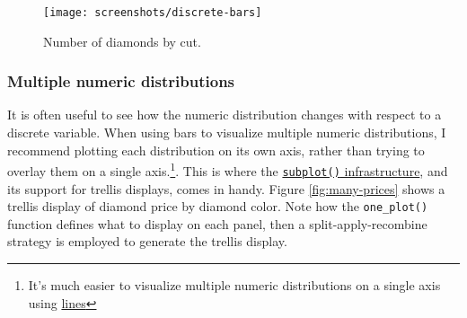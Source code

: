 \documentclass[12pt,]{isuthesis}
\newenvironment{Shaded}{\begin{snugshade}}{\end{snugshade}}
\newcommand{\KeywordTok}[1]{\textcolor[rgb]{0.13,0.29,0.53}{\textbf{{#1}}}}
\newcommand{\DataTypeTok}[1]{\textcolor[rgb]{0.13,0.29,0.53}{{#1}}}
\newcommand{\StringTok}[1]{\textcolor[rgb]{0.31,0.60,0.02}{{#1}}}
\newcommand{\NormalTok}[1]{{#1}}
\let\rmarkdownfootnote\footnote%
\def\footnote{\protect\rmarkdownfootnote}
\begin{document}
\begin{Shaded}
\end{Shaded}

\begin{figure}
\centering
\texttt{[image: screenshots/discrete-bars]}
\caption{\label{fig:discrete}Number of diamonds by cut.}
\end{figure}

\subsubsection{Multiple numeric
distributions}\label{multiple-numeric-distributions}

It is often useful to see how the numeric distribution changes with
respect to a discrete variable. When using bars to visualize multiple
numeric distributions, I recommend plotting each distribution on its own
axis, rather than trying to overlay them on a single axis.\footnote{It's
  much easier to visualize multiple numeric distributions on a single
  axis using \protect\hyperlink{lines}{lines}}. This is where the
\protect\hyperlink{subplot}{\texttt{subplot()} infrastructure}, and its
support for trellis displays, comes in handy. Figure
\ref{fig:many-prices} shows a trellis display of diamond price by
diamond color. Note how the \texttt{one\_plot()} function defines what
to display on each panel, then a split-apply-recombine strategy is
employed to generate the trellis display.
\end{document}
